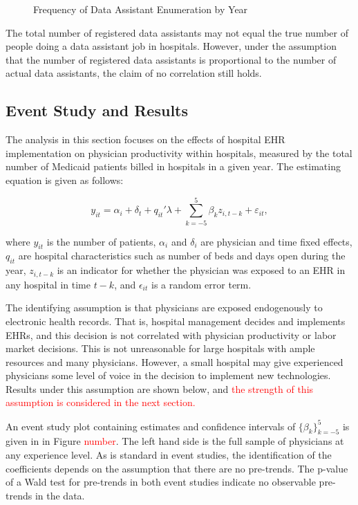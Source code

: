 \documentclass[11pt]{article}
\begin{document}
\vspace{5mm}
\begin{figure}[ht]
\caption{Frequency of Data Assistant Enumeration by Year}

    \label{fig:dataassistant_histogram}
\end{figure}

The total number of registered data assistants may not equal the true number of people doing a data assistant job in hospitals. However, under the assumption that the number of registered data assistants is proportional to the number of actual data assistants, the claim of no correlation still holds. 


\subsection{Event Study and Results}

The analysis in this section focuses on the effects of hospital EHR implementation on physician productivity within hospitals, measured by the total number of Medicaid patients billed in hospitals in a given year. The estimating equation is given as follows: 

\begin{equation*}
    y_{it}=\alpha_i+\delta_t+q_{it}'\lambda+\sum_{k=-5}^5 \beta_kz_{i,t-k} + \varepsilon_{it},
\end{equation*}

where $y_{it}$ is the number of patients, $\alpha_i$ and $\delta_i$ are physician and time fixed effects, $q_{it}$ are hospital characteristics such as number of beds and days open during the year, $z_{i,t-k}$ is an indicator for whether the physician was exposed to an EHR in any hospital in time $t-k$, and $\epsilon_{it}$ is a random error term. 

The identifying assumption is that physicians are exposed endogenously to electronic health records. That is, hospital management decides and implements EHRs, and this decision is not correlated with physician productivity or labor market decisions. This is not unreasonable for large hospitals with ample resources and many physicians. However, a small hospital may give experienced physicians some level of voice in the decision to implement new technologies. Results under this assumption are shown below, and  \textcolor{red}{the strength of this assumption is considered in the next section. } 

An event study plot containing estimates and confidence intervals of  $\{\beta_k\}_{k=-5}^5$  is given in in Figure \textcolor{red}{number}. The left hand side is the full sample of physicians at any experience level. As is standard in event studies, the identification of the coefficients depends on the assumption that there are no pre-trends. The p-value of a Wald test for pre-trends in both event studies indicate no observable pre-trends in the data.
\end{document}
